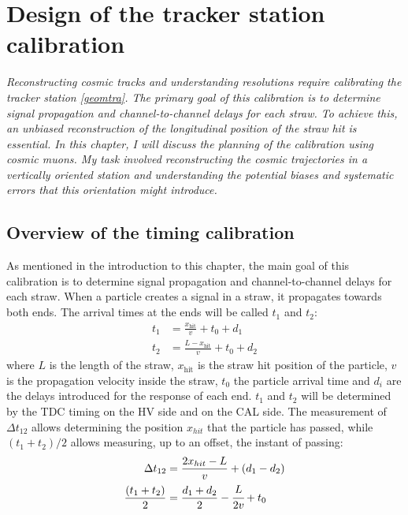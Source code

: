 \chapter{Design of the tracker station calibration}\label{planning}
\textit{Reconstructing cosmic tracks and understanding resolutions require 
calibrating the tracker station \ref{geomtra}. 
The primary goal of this calibration is to determine signal propagation and 
channel-to-channel delays for each straw. To achieve this, an unbiased 
reconstruction of the longitudinal position of the straw 
hit is essential. In this chapter, I will discuss the planning 
of the calibration using cosmic muons. My task 
involved reconstructing the cosmic trajectories in a vertically 
oriented station and understanding the potential 
biases and systematic errors that this orientation might introduce.}
\section{Overview of the timing calibration}
As mentioned in the introduction to this chapter, the main goal of this calibration is to determine signal propagation and channel-to-channel delays for each straw.
When a particle creates a signal in a straw, it propagates towards both ends. 
The arrival times at the ends will be called $t_1$ and $t_2$:
\begin{equation}
\begin{aligned}
    t_1 &= \frac{x_{\text{hit}}}{v} + t_0 + d_1 \\
    t_2 &= \frac{L - x_{\text{hit}}}{v} + t_0 + d_2
\end{aligned}
\end{equation}
where $L$ is the length of the straw, $x_{\text{hit}}$ is the straw hit position 
of the particle, $v$ is the propagation velocity inside the straw, $t_0$ the particle arrival time and $d_i$ 
are the delays introduced for the response of each end. $t_1$ and $t_2$ will be determined by the TDC timing on the HV side and on the CAL side.
The measurement of $\Delta t_{12}$ allows determining the position $x_{hit}$ that the particle has passed, 
while $(t_1 + t_2) / 2$ allows measuring, up to an offset, the instant of passing:
\begin{equation}\label{ffffff}
    \begin{aligned}
        \Delta t_{12} &= \frac{2x_{hit}-L}{v} +(d_1-d_2)  \\
        \frac{(t_1 + t_2)}{2} &= \frac{d_1+d_2}{2}-\cfrac{L}{2v}+t_0 
    \end{aligned}
    \end{equation}
